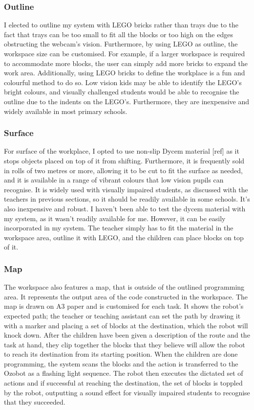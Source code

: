 \documentclass[oneside,%
                    author={Malak Hajji},
                    degree={BSc},
                    title={Designing An Accessible Computational Toolkit For Students},
                  subtitle={With Mixed Visual Abilities}]{dissertation}
\begin{document}
\subsubsection{Outline}
I elected to outline my system with LEGO bricks rather than trays due to the fact that trays can be too small to fit all the blocks or too high on the edges obstructing the webcam's vision. Furthermore, by using LEGO as outline, the workspace size can be customised. For example, if a larger workspace is required to accommodate more blocks, the user can simply add more bricks to expand the work area. Additionally, using LEGO bricks to define the workplace is a fun and colourful method to do so. Low vision kids may be able to identify
the LEGO's bright colours, and visually challenged students would be able to recognise the outline due to the indents on the LEGO's. Furthermore, they are inexpensive and widely available in most primary schools.

\subsubsection{Surface}
For surface of the workplace, I opted to use non-slip Dycem material [ref] as it stops objects placed on top of it from shifting. Furthermore, it is frequently sold in rolls of two metres or more, allowing it to be cut to fit the surface as needed, and it is available in a range of vibrant colours that low vision pupils can recognise. It is widely used with visually impaired students, as discussed with the teachers in previous sections, so it should be readily available in some schools. It's also inexpensive and robust. I haven't been able to test the dycem material with my system, as it wasn't readily available for me. However, it can be easily incorporated in my system. The teacher simply has to fit the material in the workspace area, outline it with LEGO, and the children can place blocks on top of it. 
\subsubsection{Map}
The workspace also features a map, that is outside of the outlined programming area. It represents the output area of the code constructed in the workspace. 
The map is drawn on A3 paper and is customised for each task. It shows the robot's expected path; the teacher or teaching assistant can set the path by drawing it with a marker and placing a set of blocks at the destination, which the robot will knock down. After the children have been given a description of the route and the task at hand, they clip together the blocks that they believe will allow the robot to reach its destination from its starting position. When the children are done programming, the system scans the blocks and the action is transferred to the Ozobot as a flashing light sequence. The robot then executes the dictated set of actions and if successful at reaching the destination, the set of blocks is toppled by the robot, outputting a sound effect for visually impaired students to recognise that they succeeded. 
\end{document}
